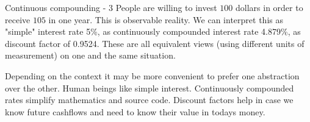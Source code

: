 \documentclass{beamer}
\begin{document}
\begin{frame}{Continuous compounding - 3}
\justify
People are willing to invest $100$ dollars in order to receive $105$ in one year. This is observable reality. We can interpret this as "simple" interest rate 5\%, as continuously compounded interest rate 4.879\%, as discount factor of 0.9524. These are all equivalent views (using different units of measurement) on one and the same situation.

\justify 
Depending on the context it may be more convenient to prefer one abstraction over the other. Human beings like simple interest. Continuously compounded rates simplify mathematics and source code. Discount factors help in case we know future cashflows and need to know their value in todays money.
\end{frame}
\end{document}
